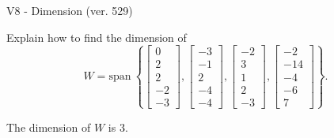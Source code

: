\begin{exercise}
  \begin{exerciseTitle}V8 - Dimension (ver. 529)\end{exerciseTitle}
  \begin{exerciseStatement}
    Explain how to find the dimension of 
\[W=\mathrm{span}\ \left\{\left[\begin{array}{r}
0 \\
2 \\
2 \\
-2 \\
-3
\end{array}\right] , \left[\begin{array}{r}
-3 \\
-1 \\
2 \\
-4 \\
-4
\end{array}\right] , \left[\begin{array}{r}
-2 \\
3 \\
1 \\
2 \\
-3
\end{array}\right] , \left[\begin{array}{r}
-2 \\
-14 \\
-4 \\
-6 \\
7
\end{array}\right]\right\}.\]



  \end{exerciseStatement}
  \begin{exerciseAnswer}
   The dimension of \(W\) is  \(3\).
  


  \end{exerciseAnswer}
\end{exercise}